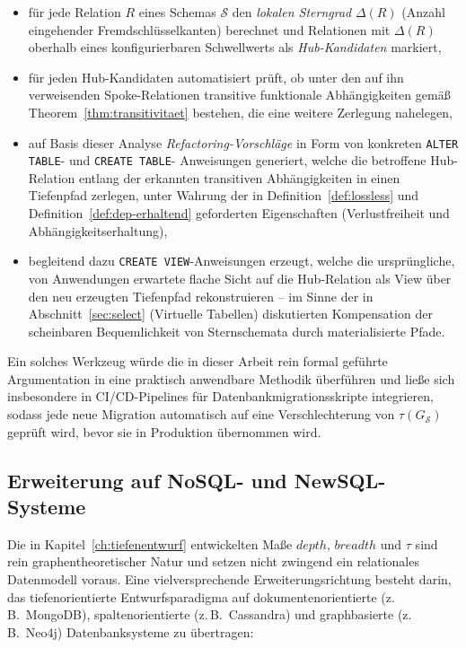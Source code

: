 ﻿\documentclass[a4paper,12pt]{report}
\theoremstyle{definition}
\theoremstyle{remark}
\newcommand{\depth}{\mathit{depth}}
\newcommand{\breadth}{\mathit{breadth}}
\begin{document}
\begin{itemize}
  \item für jede Relation $R$ eines Schemas $\mathcal{S}$ den
    \emph{lokalen Sterngrad} $\Delta(R)$ (Anzahl eingehender
    Fremdschlüsselkanten) berechnet und Relationen mit $\Delta(R)$
    oberhalb eines konfigurierbaren Schwellwerts als
    \emph{Hub-Kandidaten} markiert,
  \item für jeden Hub-Kandidaten automatisiert prüft, ob unter den auf
    ihn verweisenden Spoke-Relationen transitive funktionale
    Abhängigkeiten gemäß Theorem~\ref{thm:transitivitaet} bestehen, die
    eine weitere Zerlegung nahelegen,
  \item auf Basis dieser Analyse \emph{Refactoring-Vorschläge} in Form
    von konkreten \texttt{ALTER TABLE}- und \texttt{CREATE TABLE}-
    Anweisungen generiert, welche die betroffene Hub-Relation entlang
    der erkannten transitiven Abhängigkeiten in einen Tiefenpfad
    zerlegen, unter Wahrung der in Definition~\ref{def:lossless} und
    Definition~\ref{def:dep-erhaltend} geforderten Eigenschaften
    (Verlustfreiheit und Abhängigkeitserhaltung),
  \item begleitend dazu \texttt{CREATE VIEW}-Anweisungen erzeugt, welche
    die ursprüngliche, von Anwendungen erwartete flache Sicht auf die
    Hub-Relation als View über den neu erzeugten Tiefenpfad
    rekonstruieren -- im Sinne der in
    Abschnitt~\ref{sec:select} (\glqq Virtuelle Tabellen\grqq{})
    diskutierten Kompensation der scheinbaren Bequemlichkeit von
    Sternschemata durch materialisierte Pfade.
\end{itemize}

Ein solches Werkzeug würde die in dieser Arbeit rein formal geführte
Argumentation in eine praktisch anwendbare Methodik überführen und
ließe sich insbesondere in CI/CD-Pipelines für
Datenbankmigrationsskripte integrieren, sodass jede neue Migration
automatisch auf eine Verschlechterung von $\tau(G_{\mathcal{S}})$
geprüft wird, bevor sie in Produktion übernommen wird.

\subsection{Erweiterung auf NoSQL- und NewSQL-Systeme}
\label{sec:ausblick-nosql}

Die in Kapitel~\ref{ch:tiefenentwurf} entwickelten Maße $\depth$,
$\breadth$ und $\tau$ sind rein graphentheoretischer Natur und setzen
nicht zwingend ein relationales Datenmodell voraus. Eine
vielversprechende Erweiterungsrichtung besteht darin, das
tiefenorientierte Entwurfsparadigma auf dokumentenorientierte
(z.\,B.\ MongoDB), spaltenorientierte (z.\,B.\ Cassandra) und
graphbasierte (z.\,B.\ Neo4j) Datenbanksysteme zu übertragen:
\end{document}

